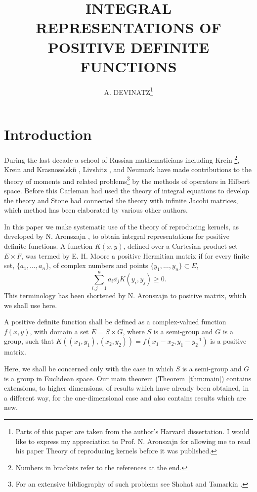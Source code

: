 \documentclass{article}
\title{INTEGRAL REPRESENTATIONS OF POSITIVE DEFINITE FUNCTIONS}
\author{A. DEVINATZ\footnote{Parts of this paper are taken from the author's Harvard dissertation. I would like to express my appreciation to Prof. N. Aronszajn for allowing me to read his paper Theory of reproducing kernels \cite{aronszajn2} before it was published.}}
\date{}
\begin{document}
\maketitle

\section{Introduction}

During the last decade a school of Russian mathematicians including Krein \cite{krein1,krein2,krein3}\footnote{Numbers in brackets refer to the references at the end.}, Krein and Krasnoselskiï \cite{krein-krasnoselskii}, Livshitz \cite{livshitz}, and Neumark \cite{neumark} have made contributions to the theory of moments and related problems\footnote{For an extensive bibliography of such problems see Shohat and Tamarkin \cite{shohat-tamarkin}.} by the methods of operators in Hilbert space. Before this Carleman \cite{carleman} had used the theory of integral equations to develop the theory and Stone \cite{stone} had connected the theory with infinite Jacobi matrices, which method has been elaborated by various other authors.

In this paper we make systematic use of the theory of reproducing kernels, as developed by N. Aronszajn \cite{aronszajn1,aronszajn2}, to obtain integral representations for positive definite functions. A function $K(x, y)$, defined over a Cartesian product set $E \times F$, was termed by E. H. Moore a positive Hermitian matrix if for every finite set, $\{a_1, \ldots, a_n\}$, of complex numbers and points $\{y_1, \ldots, y_n\} \subset E$, 
\begin{equation}
\sum_{i,j=1}^n a_i \overline{a_j} K(y_i, y_j) \geq 0.
\label{eq:positive-hermitian}
\end{equation}
This terminology has been shortened by N. Aronszajn \cite{aronszajn2} to positive matrix, which we shall use here.

A positive definite function shall be defined as a complex-valued function $f(x, y)$, with domain a set $E = S \times G$, where $S$ is a semi-group and $G$ is a group, such that $K((x_1, y_1), (x_2, y_2)) = f(x_1 - x_2, y_1 - y_2^{-1})$ is a positive matrix.

Here, we shall be concerned only with the case in which $S$ is a semi-group and $G$ is a group in Euclidean space. Our main theorem (Theorem~\ref{thm:main}) contains extensions, to higher dimensions, of results which have already been obtained, in a different way, for the one-dimensional case and also contains results which are new.
\end{document}
